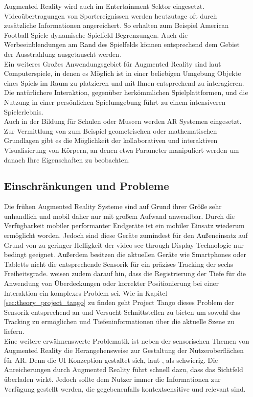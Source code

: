 Augmented Reality wird auch im Entertainment Sektor eingesetzt. Videoübertragungen von Sportereignissen werden heutzutage oft durch zusätzliche Informationen angereichert. So erhalten zum Beispiel American Football Spiele dynamische Spielfeld Begrenzungen. Auch die Werbeeinblendungen am Rand des Spielfelds können entsprechend dem Gebiet der Ausstrahlung ausgetauscht werden. \citep{azuma2001recent} \\

Ein weiteres Großes Anwendungsgebiet für Augmented Reality sind laut \citet{azuma2001recent} Computerspiele, in denen es Möglich ist in einer beliebigen Umgebung Objekte eines Spiels im Raum zu platzieren und mit Ihnen entsprechend zu interagieren. Die natürlichere Interaktion, gegenüber herkömmlichen Spielplattformen, und die Nutzung in einer persönlichen Spielumgebung führt zu einem intensiveren Spielerlebnis. \\

Auch in der Bildung für Schulen oder Museen werden AR Systemen eingesetzt. Zur Vermittlung von zum Beispiel geometrischen oder mathematischen Grundlagen gibt es die Möglichkeit der kollaborativen und interaktiven Visualisierung von Körpern, an denen etwa Parameter manipuliert werden um danach Ihre Eigenschaften zu beobachten. \citep{van2010survey} \\

\subsection{Einschränkungen und Probleme}

Die frühen Augmented Reality Systeme sind auf Grund ihrer Größe sehr unhandlich und mobil daher nur mit großem Aufwand anwendbar. Durch die Verfügbarkeit mobiler performanter Endgeräte ist ein mobiler Einsatz wiederum ermöglicht worden. Jedoch sind diese Geräte zumindest für den Außeneinsatz auf Grund von zu geringer Helligkeit der video see-through Display Technologie nur bedingt geeignet. Außerdem besitzen die aktuellen Geräte wie Smartphones oder Tabletts nicht die entsprechende Sensorik für ein präzises Tracking der sechs Freiheitsgrade. \citet{van2010survey} weisen zudem darauf hin, dass die Registrierung der Tiefe für die Anwendung von Überdeckungen oder korrekter Positionierung bei einer Interaktion ein komplexes Problem sei. Wie in Kapitel \ref{sec:theory_project_tango} zu finden geht Project Tango dieses Problem der Sensorik entsprechend an und Versucht Schnittstellen zu bieten um sowohl das Tracking zu ermöglichen und Tiefeninformationen über die aktuelle Szene zu liefern. \\

Eine weitere erwähnenswerte Problematik ist neben der sensorischen Themen von Augmented Reality die Herangehensweise zur Gestaltung der Nutzeroberflächen für AR. Denn die UI Konzeption gestaltet sich, laut \citet{azuma2001recent}, als schwierig. Die Anreicherungen durch Augmented Reality führt schnell dazu, dass das Sichtfeld überladen wirkt. Jedoch sollte dem Nutzer immer die Informationen zur Verfügung gestellt werden, die gegebenenfalls kontextsensitive und relevant sind. \\

